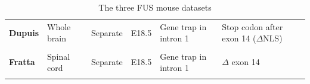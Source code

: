 \begin{longtable}[]{@{}llllll@{}}
\begin{minipage}[t]{0.16\columnwidth}
		{\textbf{Dupuis}}
		{\footnotesize\citep{Scekic-zahirovic2016}}\strut
	\end{minipage} & \begin{minipage}[t]{0.14\columnwidth}\raggedright\strut
		{Whole brain}\strut
	\end{minipage} & \begin{minipage}[t]{0.12\columnwidth}\raggedright\strut
		{Separate}\strut
	\end{minipage} & \begin{minipage}[t]{0.10\columnwidth}\raggedright\strut
		{E18.5}\strut
	\end{minipage} & \begin{minipage}[t]{0.16\columnwidth}\raggedright\strut
		{Gene trap in intron 1}\strut
	\end{minipage} & \begin{minipage}[t]{0.16\columnwidth}\raggedright\strut
		{Stop codon after exon 14 ($\Delta$NLS)}\strut
	\end{minipage}\tabularnewline \\
	\begin{minipage}[t]{0.16\columnwidth}\raggedright\strut
		{\textbf{Fratta}}\strut
	\end{minipage} & \begin{minipage}[t]{0.14\columnwidth}\raggedright\strut
		{Spinal cord}\strut
	\end{minipage} & \begin{minipage}[t]{0.12\columnwidth}\raggedright\strut
		{Separate}\strut
	\end{minipage} & \begin{minipage}[t]{0.10\columnwidth}\raggedright\strut
		{E18.5}\strut
	\end{minipage} & \begin{minipage}[t]{0.16\columnwidth}\raggedright\strut
		{Gene trap in intron 1}\strut
	\end{minipage} & \begin{minipage}[t]{0.16\columnwidth}\raggedright\strut
		{$\Delta$ exon 14 }
		{\footnotesize\citep{Devoy2017}}  \strut
	\end{minipage}\tabularnewline
	\caption{The three FUS mouse datasets}
	\label{tab:fus_datasets}
\end{longtable}


